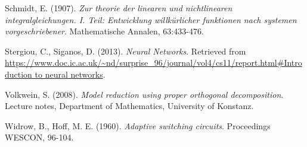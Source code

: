 \documentclass{elsarticle}
\numberwithin{equation}{section}
\theoremstyle{theorem}
\theoremstyle{definition}
\theoremstyle{remark}
\theoremstyle{proposition}
\numberwithin{figure}{section}
\begin{document}
\begin{thebibliography}{50}
		Schmidt, E. (1907). \emph{Zur theorie der linearen und nichtlinearen integralgleichungen. I. Teil: Entwicklung willk\"urlicher funktionen nach systemen vorgeschriebener}. Mathematische Annalen, 63:433-476.
		
		Stergiou, C., Siganos, D. (2013). \emph{Neural Networks}. Retrieved from \url{https://www.doc.ic.ac.uk/~nd/surprise_96/journal/vol4/cs11/report.html#Introduction to neural networks}.
		
		Volkwein, S. (2008). \emph{Model reduction using proper orthogonal decomposition}. Lecture notes, Department of Mathematics, University of Konstanz.
		
		Widrow, B., Hoff, M. E. (1960). \emph{Adaptive switching circuits}. Proceedings WESCON, 96-104.
		
	\end{thebibliography}
	
\end{document}
